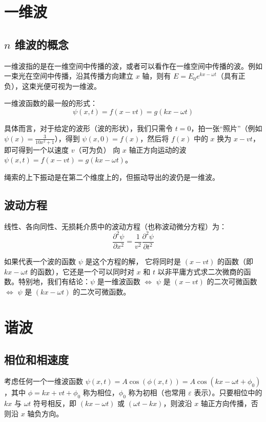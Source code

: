\documentclass[UTF8]{report}
\theoremstyle{MyLineTheoremStyle} %
\theoremstyle{MyBlockTheoremStyle} %
\theoremstyle{MySubsubsectionStyle} %
\begin{document}
\section{一维波}

\subsection{$n$ 维波的概念}

一维波指的是在一维空间中传播的波，或者可以看作在一维空间中传播的波。例如一束光在空间中传播，沿其传播方向建立 $x$ 轴，则有 $E = E_0 e^{kx - \omega t}$（具有正负），这束光便可视为一维波。

一维波函数的最一般的形式：
\begin{equation}
\psi(x,t) = f(x-vt) = g(kx - \omega t)
\end{equation}

具体而言，对于给定的波形（波的形状），我们只需令 $t=0$，拍一张“照片”（例如 $\psi(x) = \frac{3}{10x^2+1}$），得到 $\psi(x,0) = f(x)$，然后将 $f(x)$ 中的 $x$ 换为 $x-vt$，即可得到一个以速度 $v$（可为负） 向 $x$ 轴正方向运动的波 $\psi(x,t) = f(x - vt) = g(kx - \omega t)$。
{\par\color{gray}\small
绳索的上下振动是在第二个维度上的，但振动导出的波仍是一维波。
\par}


\subsection{波动方程}

线性、各向同性、无损耗介质中的波动方程（也称波动微分方程）为：
\begin{equation}
    \frac{\partial^{2}\psi}{\partial x^{2}}=\frac{1}{v^{2}}\frac{\partial^{2}\psi}{\partial t^{2}} 
\end{equation}

如果代表一个波的函数 $\psi$ 是这个方程的解， 它将同时是 $(x-vt)$ 的函数（即 $kx - \omega t$ 的函数），它还是一个可以同时对 $x$ 和 $t$ 以非平庸方式求二次微商的函数。特别地，我们有结论：$\psi$ 是一维波函数 $\Longleftrightarrow$ $\psi$ 是 $(x-vt)$ 的二次可微函数 $\Longleftrightarrow$ $\psi$ 是 $(kx - \omega t)$ 的二次可微函数。

\section{谐波}

\subsection{相位和相速度}
考虑任何一个一维波函数 $\psi(x,t) = A \cos(\phi(x,t)) = A \cos (kx - \omega t + \phi_0) $，其中 $\phi = kx+vt + \phi_0$ 称为相位，$\phi_0$ 称为初相（也常用 $\varepsilon$ 表示）。只要相位中的 $kx$ 与 $\omega t$ 符号相反，即 $(kx - \omega t)$ 或 $(\omega t - kx)$，则波沿 $x$ 轴正方向传播，否则沿 $x$ 轴负方向。
\end{document}
